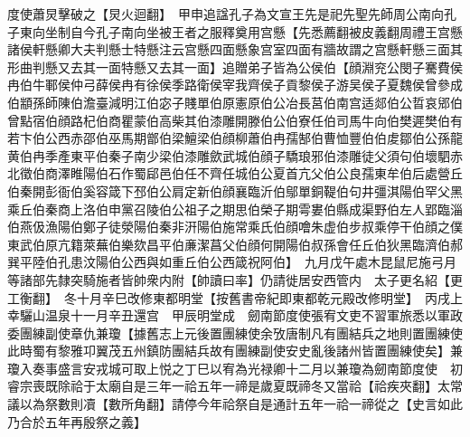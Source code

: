 度使蕭炅擊破之【炅火迴翻】　甲申追諡孔子為文宣王先是祀先聖先師周公南向孔子東向坐制自今孔子南向坐被王者之服釋奠用宫懸【先悉薦翻被皮義翻周禮王宫懸諸侯軒懸卿大夫判懸士特懸注云宫懸四面懸象宫室四面有牆故謂之宫懸軒懸三面其形曲判懸又去其一面特懸又去其一面】追贈弟子皆為公侯伯【顔淵兖公閔子騫費侯冉伯牛鄆侯仲弓薛侯冉有徐侯季路衛侯宰我齊侯子貢黎侯子游吴侯子夏魏侯曾參成伯顓孫師陳伯澹臺減明江伯宓子賤單伯原憲原伯公冶長莒伯南宫适郯伯公晢哀郳伯曾點宿伯顔路杞伯商瞿蒙伯高柴其伯漆雕開滕伯公伯寮任伯司馬牛向伯樊遲樊伯有若卞伯公西赤邵伯巫馬期鄫伯梁鱣梁伯顔柳蕭伯冉孺郜伯曹恤豐伯伯䖍鄒伯公孫龍黄伯冉季產東平伯秦子南少梁伯漆雕歛武城伯顔子驕琅邪伯漆雕徒父須句伯壞駟赤北徵伯商澤睢陽伯石作蜀郈邑伯任不齊任城伯公夏首亢父伯公良孺東牟伯后處營丘伯秦開彭衙伯奚容箴下邳伯公肩定新伯顔襄臨沂伯鄔單銅鞮伯句井彊淇陽伯罕父黑乘丘伯秦商上洛伯申黨召陵伯公祖子之期思伯榮子期雩婁伯縣成渠野伯左人郢臨淄伯燕伋漁陽伯鄭子徒滎陽伯秦非汧陽伯施常乘氏伯顔噲朱虚伯步叔乘停干伯顔之僕東武伯原亢籍萊蕪伯樂欬昌平伯亷潔菖父伯顔何開陽伯叔孫會任丘伯狄黑臨濟伯郝巽平陸伯孔患汶陽伯公西與如重丘伯公西箴祝阿伯】　九月戊午處木昆鼠尼施弓月等諸部先隸突騎施者皆帥衆内附【帥讀曰率】仍請徙居安西管内　太子更名紹【更工衡翻】　冬十月辛巳改修東都明堂【按舊書帝紀即東都乾元殿改修明堂】　丙戌上幸驪山温泉十一月辛丑還宫　甲辰明堂成　劒南節度使張宥文吏不習軍旅悉以軍政委團練副使章仇兼瓊【據舊志上元後置團練使余攷唐制凡有團結兵之地則置團練使此時蜀有黎雅卭翼茂五州鎮防團結兵故有團練副使安史亂後諸州皆置團練使矣】兼瓊入奏事盛言安戎城可取上悦之丁巳以宥為光禄卿十二月以兼瓊為劒南節度使　初睿宗喪既除祫于太廟自是三年一祫五年一禘是歲夏既禘冬又當祫【祫疾夾翻】太常議以為祭數則凟【數所角翻】請停今年祫祭自是通計五年一祫一禘從之【史言如此乃合於五年再殷祭之義】

